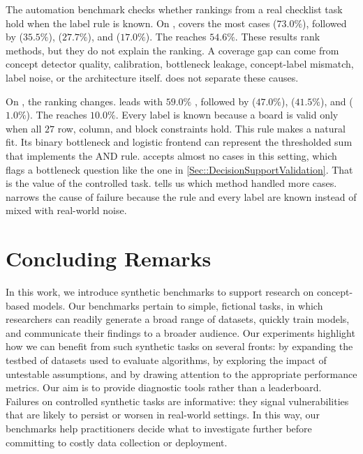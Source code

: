 \documentclass[11pt]{article}
\newcommand{\newsection}[1]{\clearpage\section{#1}}
\newcommand{\newsection}[1]{\section{#1}}
\begin{document}
The automation benchmark checks whether rankings from a real checklist task hold when the label rule is known. On , \CEM{} covers the most cases ($73.0\%$), followed by \ECBM{} ($35.5\%$), \CBM{} ($27.7\%$), and \ProbCBM{} ($17.0\%$). The \DNN{} reaches $54.6\%$. These results rank methods, but they do not explain the ranking. A coverage gap can come from concept detector quality, calibration, bottleneck leakage, concept-label mismatch, label noise, or the architecture itself.  does not separate these causes.

On , the ranking changes. \CBM{} leads with $59.0\%$ \wrk{}, followed by \ECBM{} ($47.0\%$), \CEM{} ($41.5\%$), and \ProbCBM{} ($1.0\%$). The \DNN{} reaches $10.0\%$. Every label is known because a board is valid only when all $27$ row, column, and block constraints hold. This rule makes \CBM{} a natural fit. Its binary bottleneck and logistic frontend can represent the thresholded sum that implements the AND rule. \ProbCBM{} accepts almost no cases in this setting, which flags a bottleneck question like the one in \cref{Sec::DecisionSupportValidation}. That is the value of the controlled task.  tells us which method handled more cases.  narrows the cause of failure because the rule and every label are known instead of mixed with real-world noise.

\newsection{Concluding Remarks}
\label{Sec::ConcludingRemarks}


In this work, we introduce synthetic benchmarks to support research on concept-based models. Our benchmarks pertain to simple, fictional tasks, in which researchers can readily generate a broad range of datasets, quickly train models, and communicate their findings to a broader audience. Our experiments highlight how we can benefit from such synthetic tasks on several fronts: by expanding the testbed of datasets used to evaluate algorithms, by exploring the impact of untestable assumptions, and by drawing attention to the appropriate performance metrics. Our aim is to provide diagnostic tools rather than a leaderboard. Failures on controlled synthetic tasks are informative: they signal vulnerabilities that are likely to persist or worsen in real-world settings. In this way, our benchmarks help practitioners decide what to investigate further before committing to costly data collection or deployment.
\end{document}
